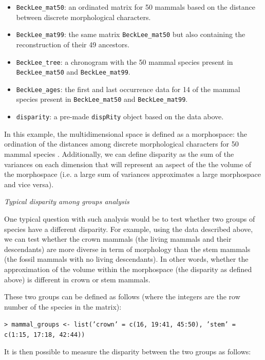 \documentclass[12pt,letterpaper]{article}
\renewcommand{\subsection}[1]{%
\bigskip
\begin{center}
\begin{large}
\normalfont\itshape #1
\end{large}
\end{center}}
\newcommand{\disp}{\texttt{dispRity} }
\begin{document}
\begin{itemize}
    \item \texttt{BeckLee\_mat50}: an ordinated matrix for 50 mammals based on the distance between discrete morphological characters.
    \item \texttt{BeckLee\_mat99}: the same matrix \texttt{BeckLee\_mat50} but also containing the reconstruction of their 49 ancestors.
    \item \texttt{BeckLee\_tree}: a chronogram with the 50 mammal species present in \texttt{BeckLee\_mat50} and \texttt{BeckLee\_mat99}.
    \item \texttt{BeckLee\_ages}: the first and last occurrence data for 14 of the mammal species present in \texttt{BeckLee\_mat50} and \texttt{BeckLee\_mat99}.
    \item \texttt{disparity}: a pre-made \disp object based on the data above.
\end{itemize}

In this example, the multidimensional space is defined as a morphospace: the ordination of the distances among discrete morphological characters for 50 mammal species \citep[from][]{beckancient2014}.
Additionally, we can define disparity as the sum of the variances on each dimension \citep{Wills1994} that will represent an aspect of the the volume of the morphospace (i.e. a large sum of variances approximates a large morphospace and vice versa).

\subsection{Typical disparity among groups analysis}
One typical question with such analysis would be to test whether two groups of species have a different disparity.
For example, using the data described above, we can test whether the crown mammals (the living mammals and their descendants) are more diverse in term of morphology than the stem mammals (the fossil mammals with no living descendants).
In other words, whether the approximation of the volume within the morphospace (the disparity as defined above) is different in crown or stem mammals.

\noindent These two groups can be defined as follows (where the integers are the row number of the species in the matrix):

\noindent \texttt{> mammal\_groups <- list('crown' = c(16, 19:41, 45:50), 'stem' = c(1:15, 17:18, 42:44))}

\noindent It is then possible to measure the disparity between the two groups as follows:
\end{document}
